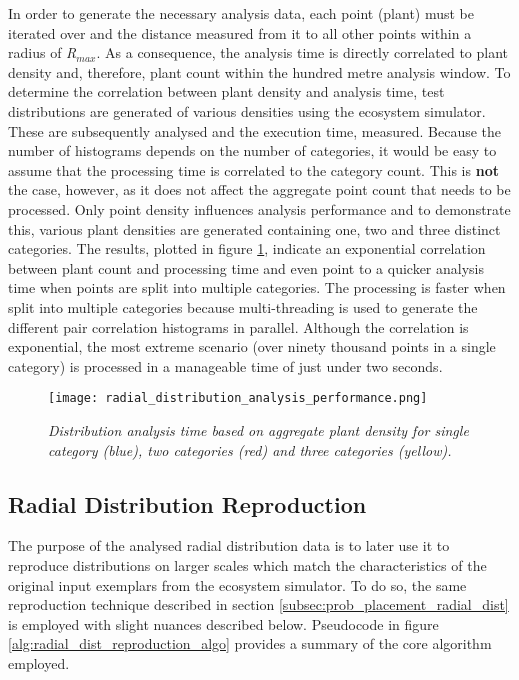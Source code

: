In order to generate the necessary analysis data, each point (plant) must be iterated over and the distance measured from it to all other points within a radius of \textit{R$_{max}$}. As a consequence, the analysis time is directly correlated to plant density and, therefore, plant count within the hundred metre analysis window. To determine the correlation between plant density and analysis time, test distributions are generated of various densities using the ecosystem simulator. These are subsequently analysed and the execution time, measured. Because the number of histograms depends on the number of categories, it would be easy to assume that the processing time is correlated to the category count. This is \textbf{not} the case, however, as it does not affect the aggregate point count that needs to be processed. Only point density influences analysis performance and to demonstrate this, various plant densities are generated containing one, two and three distinct categories. The results, plotted in figure \ref{fig:analysis_perf}, indicate an exponential correlation between plant count and processing time and even point to a quicker analysis time when points are split into multiple categories. The processing is faster when split into multiple categories because multi-threading is used to generate the different pair correlation histograms in parallel. Although the correlation is exponential, the most extreme scenario (over ninety thousand points in a single category) is processed in a manageable time of just under two seconds. \\

\begin{figure}
\center
	\texttt{[image: radial\_distribution\_analysis\_performance.png]}
	\caption{ \textit{Distribution analysis time based on aggregate plant density for single category (blue), two categories (red) and three categories (yellow).}}	
	\label{fig:analysis_perf}
\end{figure}

\subsection{Radial Distribution Reproduction}

The purpose of the analysed radial distribution data is to later use it to reproduce distributions on larger scales which match the characteristics of the original input exemplars from the ecosystem simulator. To do so, the same reproduction technique described in section \ref{subsec:prob_placement_radial_dist} is employed with slight nuances described below. Pseudocode in figure \ref{alg:radial_dist_reproduction_algo} provides a summary of the core algorithm employed.

